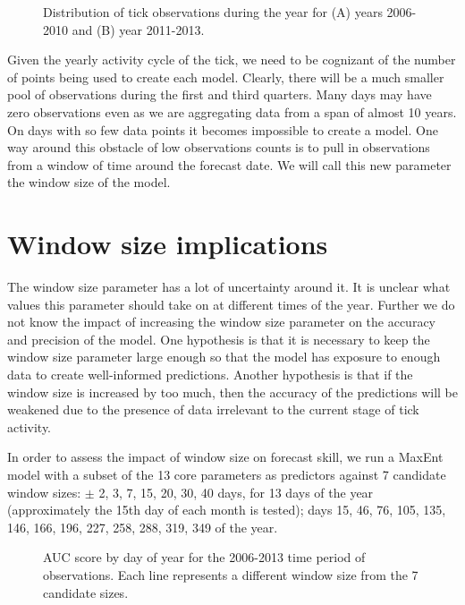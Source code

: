 \begin{figure} [!ht]
\centerline{}
\caption{Distribution of tick observations during the year for (A) years 2006-2010 and (B) year 2011-2013. }
\label{fig6}
\end{figure}


\noindent Given the yearly activity cycle of the tick, we need to be cognizant of the number of points being used to create each model. Clearly, there will be a much smaller pool of observations during the first and third quarters. Many days may have zero observations even as we are aggregating data from a span of almost 10 years. On days with so few data points it becomes impossible to create a model. One way around this obstacle of low observations counts is to pull in observations from a window of time around the forecast date. We will call this new parameter the window size of the model. \newline

\section{Window size implications }

\noindent The window size parameter has a lot of uncertainty around it. It is unclear what values this parameter should take on at different times of the year. Further we do not know the impact of increasing the window size parameter on the accuracy and precision of the model. One hypothesis is that it is necessary to keep the window size parameter large enough so that the model has exposure to enough data to create well-informed predictions. Another hypothesis is that if the window size is increased by too much, then the accuracy of the predictions will be weakened due to the presence of data irrelevant to the current stage of tick activity. \newline

\noindent In order to assess the impact of window size on forecast skill, we run a MaxEnt model with a subset of the 13 core parameters as predictors against 7 candidate window sizes: $\pm$ 2, 3, 7, 15, 20, 30, 40 days, for 13 days of the year (approximately the 15th day of each month is tested); days 15, 46, 76, 105, 135, 146, 166, 196, 227, 258, 288, 319, 349 of the year. \newline

\begin{figure} [!ht]
\centerline{}
\caption{AUC score by day of year for the 2006-2013 time period of observations. Each line represents a different window size from the 7 candidate sizes. }
\label{fig6}
\end{figure}

